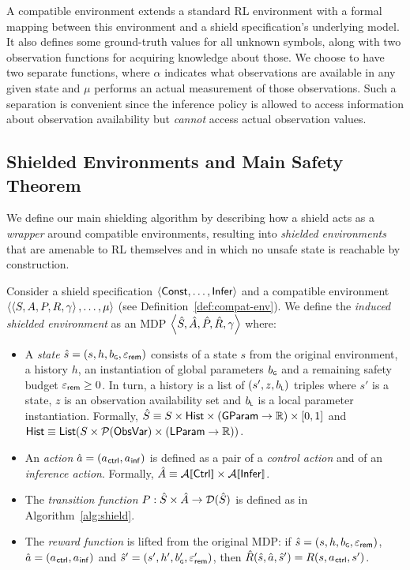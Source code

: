 \documentclass[acmsmall,screen,nonacm]{acmart}
\begin{document}
A compatible environment extends a standard RL environment with a formal mapping between this environment and a shield specification's underlying model. It also defines some ground-truth values for all unknown symbols, along with two observation functions for acquiring knowledge about those. We choose to have two separate functions, where $\alpha$ indicates what observations are available in any given state and $\mu$ performs an actual measurement of those observations. Such a separation is convenient since the inference policy is allowed to access information about observation availability but \emph{cannot} access actual observation values.

\subsection{Shielded Environments and Main Safety Theorem}\label{sec:shielded-env}

We define our main shielding algorithm by describing how a shield acts as a \emph{wrapper} around compatible environments, resulting into \emph{shielded environments} that are amenable to RL themselves and in which no unsafe state is reachable by construction.



\begin{definition}\label{def:shielded-env}
Consider a shield specification $\left\langle\mathsf{Const}, \dots, \mathsf{Infer}\right\rangle$ and a compatible environment $\left\langle\left\langle S, A, P, R, \gamma\right\rangle, \dots, \mu\right\rangle$ (see Definition~\ref{def:compat-env}). We define the \emph{induced shielded environment} as an MDP $\left\langle\hat S, \hat A, \hat P, \hat R, \gamma\right\rangle$ where:
\begin{itemize}
  \item A \emph{state} $\hat s = (s, h, b_\textsf{\tiny G}, \varepsilon_{\mathsf{rem}})$ consists of a state $s$ from the original environment, a history $h$, an instantiation of global parameters $b_\textsf{\tiny G}$ and a remaining safety budget $\varepsilon_{\mathsf{rem}} \ge 0$. In turn, a history is a list of $(s', z, b_\textsf{\tiny L})$ triples where $s'$ is a state, $z$ is an observation availability set and $b_\textsf{\tiny L}$ is a local parameter instantiation. Formally, $\hat S \equiv S \times \mathsf{Hist} \times (\mathsf{GParam} \to \mathbb{R}) \times [0, 1]$ and $\mathsf{Hist} \equiv \mathsf{List}(S \times \mathcal{P}(\mathsf{ObsVar}) \times (\mathsf{LParam} \to \mathbb{R}))$.
  \item An \emph{action} $\hat a = (a_{\mkern1mu\mathsf{ctrl}}, a_{\mkern1mu\mathsf{inf}})$ is defined as a pair of a \emph{control action} and of an \emph{inference action}. Formally, $\ShieldedAction \equiv \CtrlActionSem{\Ctrl} \times \InfActionSem{\Inference}$.
  \item The \emph{transition function} $P : \hat S \times \hat A \to \mathcal{D}(\hat S)$ is defined as in Algorithm~\ref{alg:shield}.
  \item The \emph{reward function} is lifted from the original MDP: if $\hat s = (s, h, b_\textsf{\tiny G}, \varepsilon_{\mathsf{rem}})$, $\hat a = (a_{\mkern1mu\mathsf{ctrl}}, a_{\mkern1mu\mathsf{inf}})$ and $\hat s' = (s', h', b_\textsf{\tiny G}', \varepsilon_{\mathsf{rem}}')$, then $\hat R(\hat s, \hat a, \hat s') = R(s, a_{\mkern1mu\mathsf{ctrl}}, s')$.
\end{itemize}
\end{definition}
\end{document}
